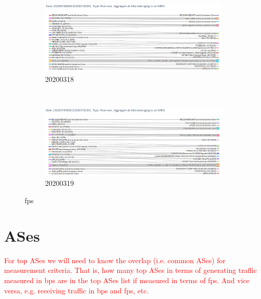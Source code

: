 \documentclass[10pt, journal, letterpaper]{IEEEtran}
\newcommand\boxFigSze{1}
\newcommand{\red}[1]{\textcolor{red}{#1}}
\begin{document}
\begin{figure}
    \begin{subfigure}{\boxFigSze\textwidth}
          \centering
          \includegraphics[width=\columnwidth]{img/sankey_20200318_NRENlevel_fps.png}
          \caption{20200318}
          \label{fig:top_generating_fps}
    \end{subfigure}\\
    \begin{subfigure}{\boxFigSze\textwidth}
          \centering
          \includegraphics[width=\columnwidth]{img/sankey_20200319_NRENlevel_fps.png}
          \caption{20200319}
          \label{fig:top_receiving_fps}
    \end{subfigure}
    \caption{fps}
    \label{fig:sankey_bps}
\end{figure}

\section{ASes}

\red{For top ASes we will need to know the overlap (i.e. common ASes) for measurement criteria. That is, how many top ASes in terms of generating traffic measured in bps are in the top ASes list if measured in terms of fps. And vice versa, e.g. receiving traffic in bps and fps, etc.}
\end{document}
